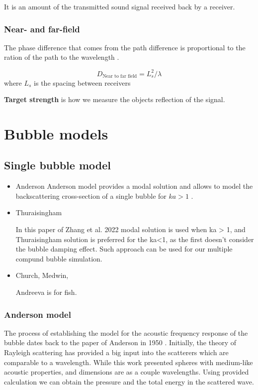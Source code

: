 It is an amount of the transmitted sound signal received back by a receiver.

\subsubsection{Near- and far-field}
The phase difference that comes from the path difference is proportional to the ration of the path to the wavelength \cite[p.30]{leighton_acoustic_2012}.

\[D_\text{Near to far field} = L_s^2/\lambda\] 
where $L_s$ is the spacing between receivers


\textbf{Target strength} is how we measure the objects reflection of the signal. %


\section{Bubble models}
\subsection{Single bubble model}

\begin{itemize}
    \item Anderson
    Anderson model provides a modal solution and allows to model the backscattering cross-section of a single bubble for $ka > 1$ \cite{anderson_sound_2005}.

    \item Thuraisingham

    In this paper of Zhang et al. 2022 \cite{zhang_efficient_2022} modal solution is used when ka > 1, and Thuraisingham solution is preferred for the ka<1, as the first doesn't consider the bubble damping effect.  Such approach can be used for our multiple compund bubble simulation.

    \item Church, Medwin,

    Andreeva is for fish.

\end{itemize}

\subsubsection{Anderson model}
The process of establishing the model for the acoustic frequency response of the bubble dates back to the paper of Anderson in 1950 \cite{anderson_sound_2005}. Initially, the theory of Rayleigh scattering has provided a big input into the scatterers which are comparable to a wavelength. While this work presented spheres with medium-like acoustic properties, and dimensions are as a couple  wavelengths. Using provided calculation we can obtain the pressure and the total energy in the scattered wave.

